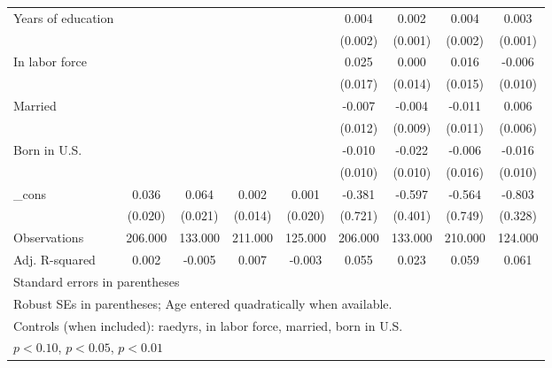 \begin{table}[htbp]
\begin{tabular}{l*{8}{c}}
Years of education&                  &                  &                  &                  &    0.004         &    0.002         &    0.004\sym{*}  &    0.003\sym{**} \\
          &                  &                  &                  &                  &  (0.002)         &  (0.001)         &  (0.002)         &  (0.001)         \\
In labor force&                  &                  &                  &                  &    0.025         &    0.000         &    0.016         &   -0.006         \\
          &                  &                  &                  &                  &  (0.017)         &  (0.014)         &  (0.015)         &  (0.010)         \\
Married   &                  &                  &                  &                  &   -0.007         &   -0.004         &   -0.011         &    0.006         \\
          &                  &                  &                  &                  &  (0.012)         &  (0.009)         &  (0.011)         &  (0.006)         \\
Born in U.S.&                  &                  &                  &                  &   -0.010         &   -0.022\sym{**} &   -0.006         &   -0.016         \\
          &                  &                  &                  &                  &  (0.010)         &  (0.010)         &  (0.016)         &  (0.010)         \\
\_cons    &    0.036\sym{*}  &    0.064\sym{***}&    0.002         &    0.001         &   -0.381         &   -0.597         &   -0.564         &   -0.803\sym{**} \\
          &  (0.020)         &  (0.021)         &  (0.014)         &  (0.020)         &  (0.721)         &  (0.401)         &  (0.749)         &  (0.328)         \\
\midrule
Observations&  206.000         &  133.000         &  211.000         &  125.000         &  206.000         &  133.000         &  210.000         &  124.000         \\
Adj. R-squared&    0.002         &   -0.005         &    0.007         &   -0.003         &    0.055         &    0.023         &    0.059         &    0.061         \\
\bottomrule
\multicolumn{9}{l}{\footnotesize Standard errors in parentheses}\\
\multicolumn{9}{l}{\footnotesize Robust SEs in parentheses; Age entered quadratically when available.}\\
\multicolumn{9}{l}{\footnotesize Controls (when included): raedyrs, in labor force, married, born in U.S.}\\
\multicolumn{9}{l}{\footnotesize \sym{*} \(p<0.10\), \sym{**} \(p<0.05\), \sym{***} \(p<0.01\)}\\
\end{tabular}
\end{table}
